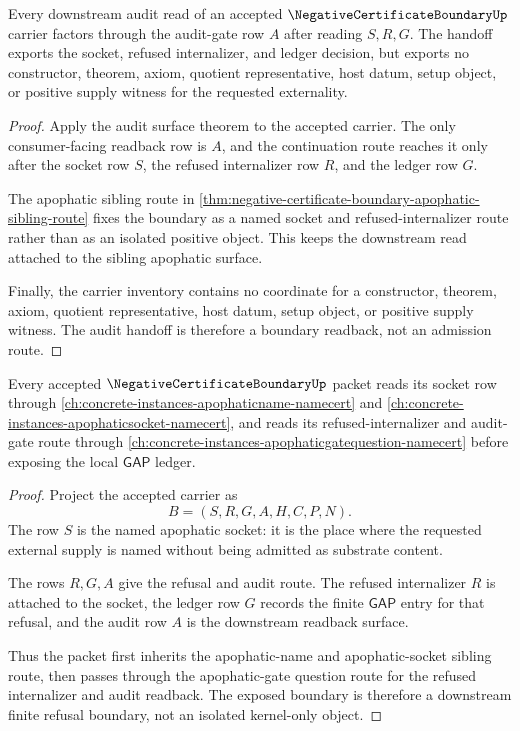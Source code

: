 \begin{theorem}
\label{thm:negative-certificate-boundary-audit-gate-handoff}
Every downstream audit read of an accepted $\NegativeCertificateBoundaryUp$ carrier factors through the audit-gate row $A$ after reading $S,R,G$. The handoff exports the socket, refused internalizer, and ledger decision, but exports no constructor, theorem, axiom, quotient representative, host datum, setup object, or positive supply witness for the requested externality.
\end{theorem}
\begin{proof}
Apply the audit surface theorem to the accepted carrier. The only consumer-facing readback row is $A$, and the continuation route reaches it only after the socket row $S$, the refused internalizer row $R$, and the ledger row $G$.

The apophatic sibling route in \autoref{thm:negative-certificate-boundary-apophatic-sibling-route} fixes the boundary as a named socket and refused-internalizer route rather than as an isolated positive object. This keeps the downstream read attached to the sibling apophatic surface.

Finally, the carrier inventory contains no coordinate for a constructor, theorem, axiom, quotient representative, host datum, setup object, or positive supply witness. The audit handoff is therefore a boundary readback, not an admission route.
\end{proof}

\begin{theorem}
\label{thm:negative-certificate-boundary-apophatic-sibling-route}
Every accepted $\NegativeCertificateBoundaryUp$ packet reads its socket row through \autoref{ch:concrete-instances-apophaticname-namecert} and \autoref{ch:concrete-instances-apophaticsocket-namecert}, and reads its refused-internalizer and audit-gate route through \autoref{ch:concrete-instances-apophaticgatequestion-namecert} before exposing the local $\mathsf{GAP}$ ledger.
\end{theorem}
\begin{proof}
Project the accepted carrier as
$$
B=(S,R,G,A,H,C,P,N).
$$
The row $S$ is the named apophatic socket: it is the place where the requested external supply is named without being admitted as substrate content.

The rows $R,G,A$ give the refusal and audit route. The refused internalizer $R$ is attached to the socket, the ledger row $G$ records the finite $\mathsf{GAP}$ entry for that refusal, and the audit row $A$ is the downstream readback surface.

Thus the packet first inherits the apophatic-name and apophatic-socket sibling route, then passes through the apophatic-gate question route for the refused internalizer and audit readback. The exposed boundary is therefore a downstream finite refusal boundary, not an isolated kernel-only object.
\end{proof}

